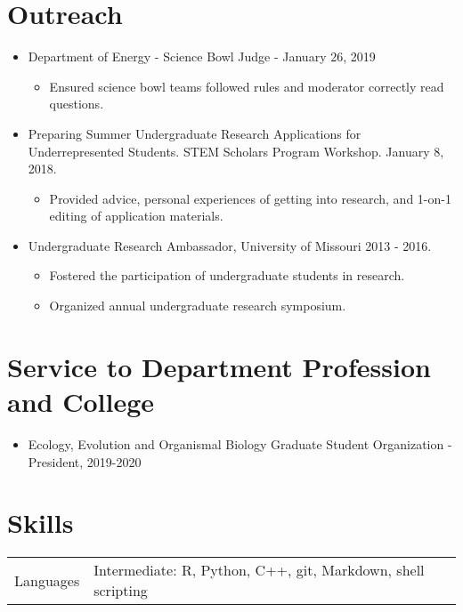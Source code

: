 \documentclass[12pt]{article}
\begin{document}
\section{Outreach}
\begin{itemize}    

\item Department of Energy - Science Bowl Judge - January 26, 2019
    \begin{itemize}
        \item Ensured science bowl teams followed rules and moderator correctly read questions.
    \end{itemize}
\item Preparing Summer Undergraduate Research Applications for Underrepresented Students. STEM Scholars Program Workshop. January 8, 2018.
    \begin{itemize}
           \item Provided advice, personal experiences of getting into research, and 1-on-1 editing of application materials.
    \end{itemize} 
\item Undergraduate Research Ambassador, University of Missouri 2013 - 2016.
    \begin{itemize}
           \item Fostered the participation of undergraduate students in research.
            \item Organized annual undergraduate research symposium.
     \end{itemize}
\end{itemize}

\section{Service to Department Profession and College}

\begin{itemize}
    \item Ecology, Evolution and Organismal Biology Graduate Student Organization - President, 2019-2020
\end{itemize}

\section{Skills}

\begin{tabular}{r|p{11cm}}
 Languages & Intermediate: R, Python, C++, git, Markdown, shell scripting \\
\end{tabular}
\end{document}
